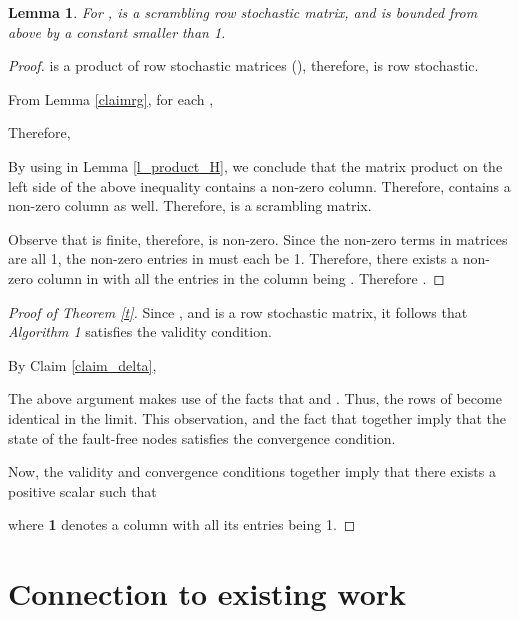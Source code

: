 \documentclass[letterpaper, 11pt]{article}
\newtheorem{lemma}[theorem]{Lemma}
\begin{document}
\begin{lemma}
\label{l_Q}
For ,  is a scrambling row stochastic matrix,
and  is bounded from above by a constant
smaller than 1.
\end{lemma}
\begin{proof}


 is a product of row stochastic matrices (), therefore,
 is row stochastic.

From Lemma \ref{claimrg}, for each ,

Therefore,

By using  in Lemma \ref{l_product_H},
we conclude that the matrix product on the left side
of the above inequality contains a non-zero column. Therefore,  contains
a non-zero column as well. Therefore,  is a scrambling matrix.

Observe that  is finite, therefore, 
is non-zero. Since the non-zero terms in  matrices are all 1,
the non-zero entries in 
must each be  1. Therefore, there exists a non-zero column in 
with all the entries in the column being .
Therefore .
\end{proof}


\begin{proof}[Proof of Theorem \ref{t}]

Since , and  is a row stochastic matrix, it
follows that
\emph {Algorithm 1} satisfies the validity condition.

By Claim \ref{claim_delta},

The above argument makes use of the facts that
 and .
Thus, the rows of  become identical in the limit.
This observation, and the fact that  together imply that
the state of the fault-free nodes satisfies the
convergence condition.


Now, the validity and convergence conditions
together imply that
there exists a positive scalar  such that

where {\bf 1} denotes a column with all its entries being 1.
\end{proof}

\section{Connection to existing work}\label{app:connection}
\end{document}
